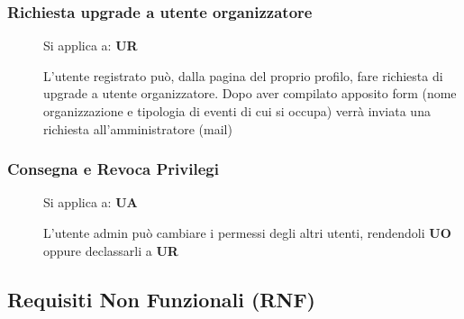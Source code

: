 \documentclass{article}
\begin{document}
\subsubsection{Richiesta upgrade a utente organizzatore}
\begin{description}
    \item[] Si applica a: \textbf{UR}
    \item[] L'utente registrato può, dalla pagina del proprio profilo, fare richiesta di upgrade a utente organizzatore. Dopo aver compilato apposito form (nome organizzazione e tipologia di eventi di cui si occupa) verrà inviata una richiesta all'amministratore (mail)
\end{description}
\subsubsection{Consegna e Revoca Privilegi}
\begin{description}
    \item[] Si applica a: \textbf{UA}
    \item[] L'utente admin può cambiare i permessi degli altri utenti, rendendoli \textbf{UO} oppure declassarli a \textbf{UR}
\end{description}
\subsection{Requisiti Non Funzionali (RNF)}
\end{document}
